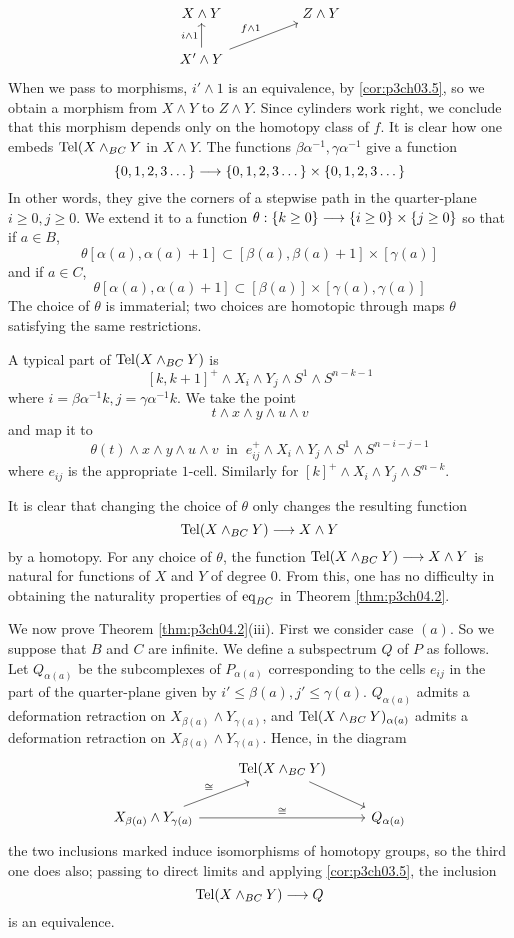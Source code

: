 \documentclass[../main]{subfiles}
\begin{document}
$$\begin{tikzcd}
X\wedge Y && Z\wedge Y\\ X'\wedge Y \arrow[u,"i\wedge 1"] \arrow[urr, "f\wedge 1"]
\end{tikzcd}$$
When we pass to morphisms, $i'\wedge 1$ is an equivalence, by \ref{cor:p3ch03.5}, so we obtain a morphism from $X\wedge Y$ to $Z\wedge Y$. Since cylinders work right, we
conclude that this morphism depends only on the homotopy class of $f$. It is clear how one embeds $\mathop{\mathrm{Tel}}(X\wedge_{BC} Y$ in $X\wedge Y$. The functions $\beta \alpha^{-1},\gamma \alpha^{-1}$ give a function $$\{0,1,2,3\dots\} \overset{}{\longrightarrow}\{0,1,2,3\dots\}\times \{0,1,2,3\dots\} $$
In other words, they give the corners of a stepwise path in the quarter-plane $i\geq 0,j\geq 0$. We extend it to a function $\theta:\{k\geq 0\} \overset{}{\longrightarrow} \{i\geq 0\}\times \{j\geq 0\}$ so that if $a\in B$,
$$\theta[\alpha(a),\alpha(a)+1]\subset [\beta(a),\beta(a)+1]\times [\gamma(a)] $$
and if $a\in C$,
$$ \theta[\alpha(a),\alpha(a)+1]\subset [\beta(a)]\times [\gamma(a),\gamma(a)] $$
The choice of $\theta$ is immaterial; two choices are homotopic through maps $\theta$ satisfying the same restrictions.

A typical part of $\mathop{\mathrm{Tel}}(X\wedge_{BC} Y)$ is $$[k,k+1]^+ \wedge X_i\wedge Y_j \wedge S^1 \wedge S^{n-k-1}$$
where $i=\beta \alpha^{-1} k, j=\gamma \alpha^{-1} k$. We take the point $$t\wedge x\wedge y\wedge u\wedge v$$
and map it to $$\theta(t)\wedge x\wedge y\wedge u\wedge v\ \text{ in } \  e_{ij}^+\wedge X_i \wedge Y_j \wedge S^1 \wedge S^{n-i-j-1}$$
where $e_{ij}$ is the appropriate $1$-cell. Similarly for $[k]^+ \wedge X_i \wedge Y_j \wedge S^{n-k}$.

It is clear that changing the choice of $\theta$ only changes the resulting function $$\mathop{\mathrm{Tel}}(X\wedge_{BC} Y) \overset{}{\longrightarrow} X\wedge Y $$
by a homotopy. For any choice of $\theta$, the function $\mathop{\mathrm{Tel}}(X\wedge_{BC}Y)\overset{}{\longrightarrow}X\wedge Y$ is natural for functions of $X$ and $Y$ of degree $0$. From this, one has no difficulty in obtaining the naturality properties of $\mathop{\mathrm{eq}}_{BC}$ in Theorem \ref{thm:p3ch04.2}.

We now prove Theorem \ref{thm:p3ch04.2}(iii). First we consider case $(a)$. So we suppose that $B$ and $C$ are infinite. We define a subspectrum $Q$ of $P$ as follows. Let $Q_{\alpha(a)}$ be the subcomplexes of $P_{\alpha(a)}$ corresponding to the cells $e_{ij}$ in the part of the quarter-plane given by $i'\leq \beta(a),j'\le \gamma(a)$. $Q_{\alpha(a)}$ admits a deformation retraction on $X_{\beta(a)}\wedge Y_{\gamma(a)}$, and $\mathop{\mathrm{Tel}}(X\wedge_{BC} Y)_{\alpha(a)}$ admits a deformation retraction on $X_{\beta(a)}\wedge Y_{\gamma(a)}$. Hence, in the diagram
$$\begin{tikzcd}
& \te{Tel}(X\wedge_{BC}Y)\arrow[dr]&\\ X_{\beta(a)}\wedge Y_{\gamma(a)} \arrow[ur,"\cong"] \arrow[rr,"\cong"] && Q_{\alpha(a)}
\end{tikzcd}$$
the two inclusions marked induce isomorphisms of homotopy groups, so
the third one does also; passing to direct limits and applying \ref{cor:p3ch03.5}, the inclusion $$\mathop{\mathrm{Tel}}(X\wedge_{BC}Y)\overset{}{\longrightarrow}Q$$
is an equivalence.
\end{document}
